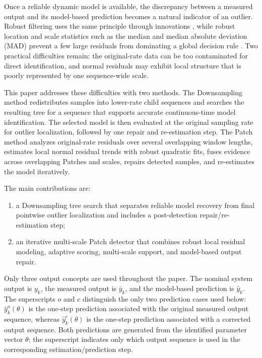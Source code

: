\documentclass[journal]{IEEEtran}
\begin{document}
Once a reliable dynamic model is available, the discrepancy between a measured output and its model-based prediction becomes a natural indicator of an outlier. Robust filtering uses the same principle through innovations \cite{masreliez1977}, while robust location and scale statistics such as the median and median absolute deviation (MAD) prevent a few large residuals from dominating a global decision rule \cite{rousseeuw1993}. Two practical difficulties remain: the original-rate data can be too contaminated for direct identification, and normal residuals may exhibit local structure that is poorly represented by one sequence-wide scale.

This paper addresses these difficulties with two methods. The Downsampling method redistributes samples into lower-rate child sequences and searches the resulting tree for a sequence that supports accurate continuous-time model identification. The selected model is then evaluated at the original sampling rate for outlier localization, followed by one repair and re-estimation step. The Patch method analyzes original-rate residuals over several overlapping window lengths, estimates local normal residual trends with robust quadratic fits, fuses evidence across overlapping Patches and scales, repairs detected samples, and re-estimates the model iteratively.

The main contributions are:
\begin{enumerate}
\item a Downsampling tree search that separates reliable model recovery from final pointwise outlier localization and includes a post-detection repair/re-estimation step;
\item an iterative multi-scale Patch detector that combines robust local residual modeling, adaptive scoring, multi-scale support, and model-based output repair.
\end{enumerate}

Only three output concepts are used throughout the paper. The nominal system output is $y_k$, the measured output is $\bar y_k$, and the model-based prediction is $\hat y_k$. The superscripts $o$ and $c$ distinguish the only two prediction cases used below: $\hat y_k^{o}(\theta)$ is the one-step prediction associated with the original measured output sequence, whereas $\hat y_k^{c}(\theta)$ is the one-step prediction associated with a corrected output sequence. Both predictions are generated from the identified parameter vector $\theta$; the superscript indicates only which output sequence is used in the corresponding estimation/prediction step.
\end{document}
